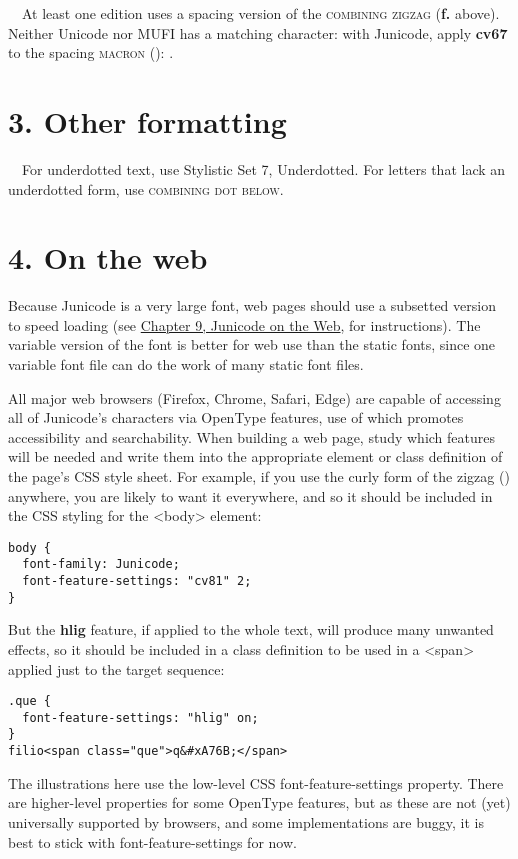 \noindent{}\ \ At least one edition uses a spacing version of the \textsc{combining zigzag}
(\textbf{f.} above).
Neither Unicode nor MUFI has a matching character: with Junicode, apply \textbf{cv67} to the spacing
\textsc{macron} (): .

\section[3. Other formatting]{3. Other formatting}
\ \ For underdotted text, use Stylistic Set 7, Underdotted. For letters that lack an underdotted form, use  \textsc{combining dot below}.

\section[4. On the web]{4. On the web}
Because Junicode is a very large font, web pages should use a subsetted version to speed loading
(see \hyperlink{OnTheWeb}{Chapter 9, Junicode on the Web}, for instructions).
The variable version of the font is better for web use than the
static fonts, since one variable font file can do the work of many static font files.

All major web browsers (Firefox, Chrome, Safari, Edge) are capable of accessing all of Junicode's characters via
OpenType features, use of which promotes accessibility and searchability. When building a web page, study which
features will be needed and write them into the appropriate element or class definition of the page's CSS style sheet.
For example, if you use the curly form of the zigzag () anywhere, you are likely to want it everywhere, and so it
should be included in the CSS styling for the <body> element:
\begin{verbatim}
body {
  font-family: Junicode;
  font-feature-settings: "cv81" 2;
}
\end{verbatim}

\noindent But the \textbf{hlig} feature, if applied to the whole text, will produce many unwanted effects, so it should be
included in a class definition to be used in a <span> applied just to the target sequence:
\begin{verbatim}
.que {
  font-feature-settings: "hlig" on;
}
filio<span class="que">q&#xA76B;</span>
\end{verbatim}

\noindent The illustrations here use the low-level CSS font-feature-settings property.
There are higher-level properties for some
OpenType features, but as these are not (yet) universally supported by browsers, and some implementations are buggy, it
is best to stick with font-feature-settings for now.

